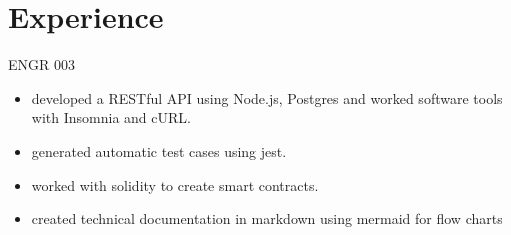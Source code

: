 \documentclass[11pt,a4paper,sans]{moderncv} %
\begin{document}
\section{Experience}
{ENGR 003
\begin{itemize}
 \item developed a RESTful API using Node.js, Postgres and worked software tools with Insomnia and cURL.
 \item generated automatic test cases using jest.
 \item worked with solidity to create smart contracts.
 \item created technical documentation in markdown using mermaid for flow charts
\end{itemize}}
 
\end{document}
